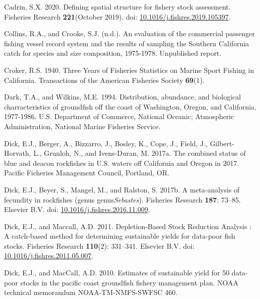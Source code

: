 \documentclass[11pt,
  english,
]{article}
\newlength{\cslhangindent}
\newenvironment{CSLReferences}[2] %
 {%
  \setlength{\parindent}{0pt}
  \ifodd #1 \everypar{\setlength{\hangindent}{\cslhangindent}}\ignorespaces\fi
  \ifnum #2 > 0
  \setlength{\parskip}{#2\baselineskip}
  \fi
 }%
 {}
\begin{document}
\begin{CSLReferences}{1}{0}
\leavevmode{}%
Cadrin, S.X. 2020. {Defining spatial structure for fishery stock assessment}. Fisheries Research \textbf{221}(October 2019). doi: \href{https://doi.org/10.1016/j.fishres.2019.105397}{10.1016/j.fishres.2019.105397}.

\leavevmode{}%
Collins, R.A., and Crooke, S.J. (n.d.). {An evaluation of the commercial passenger fishing vessel record system and the results of sampling the Southern California catch for species and size composition, 1975-1978}. Unpublished report.

\leavevmode{}%
Croker, R.S. 1940. {Three Years of Fisheries Statistics on Marine Sport Fishing in California}. Transactions of the American Fisheries Society \textbf{69}(1).

\leavevmode{}%
Dark, T.A., and Wilkins, M.E. 1994. {Distribution, abundance, and biological charracteristics of groundfish off the coast of Washington, Oregon, and California, 1977-1986}. U.S. Department of Commerce, National Oceanic; Atmospheric Administration, National Marine Fisheries Service.

\leavevmode{}%
Dick, E.J., Berger, A., Bizzarro, J., Bosley, K., Cope, J., Field, J., Gilbert-Horvath, L., Grunloh, N., and Ivens-Duran, M. 2017a. {The combined status of blue and deacon rockfishes in U.S. waters off California and Oregon in 2017}. Pacific Ficheries Management Council, Portland, OR.

\leavevmode{}%
Dick, E.J., Beyer, S., Mangel, M., and Ralston, S. 2017b. {A meta-analysis of fecundity in rockfishes (genus genus\emph{Sebastes})}. Fisheries Research \textbf{187}: 73--85. Elsevier B.V. doi: \href{https://doi.org/10.1016/j.fishres.2016.11.009}{10.1016/j.fishres.2016.11.009}.

\leavevmode{}%
Dick, E.J., and Maccall, A.D. 2011. {Depletion-Based Stock Reduction Analysis : A catch-based method for determining sustainable yields for data-poor fish stocks}. Fisheries Research \textbf{110}(2): 331--341. Elsevier B.V. doi: \href{https://doi.org/10.1016/j.fishres.2011.05.007}{10.1016/j.fishres.2011.05.007}.

\leavevmode{}%
Dick, E.J., and MacCall, A.D. 2010. {Estimates of sustainable yield for 50 data-poor stocks in the pacific coast groundfish fishery management plan}. NOAA technical memorandum NOAA-TM-NMFS-SWFSC 460.


\end{CSLReferences}
\end{document}
